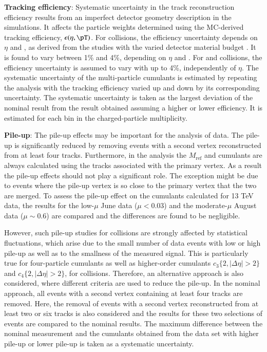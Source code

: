 \documentclass[cernpreprint,texlive=2014,txfonts,UKenglish]{latex/atlasdoc}
\begin{document}
\noindent
\textbf{Tracking efficiency}: Systematic uncertainty in the track reconstruction efficiency results from an imperfect detector geometry description in the simulations. It affects the particle weights determined using the MC-derived tracking efficiency, $\epsilon(\eta,\pT)$.  For \pp collisions, the efficiency uncertainty depends on $\eta$ and \pT, as derived from the studies with the varied detector material budget \cite{STDM-2015-02}. It is found to vary between 1\% and 4\%, depending on $\eta$ and \pT. For \pPb and \PbPb collisions, the efficiency uncertainty is assumed to vary with \pT up to 4\%, independently of $\eta$. The systematic uncertainty of the multi-particle cumulants is estimated by repeating the analysis with the tracking efficiency varied up and down by its corresponding uncertainty. The systematic uncertainty is taken as the largest deviation of the nominal result from the result obtained assuming a higher or lower efficiency. It is estimated for each bin in the charged-particle multiplicity. 

\noindent
\textbf{Pile-up}: The pile-up effects may be important for the analysis of \pp data. The pile-up is significantly reduced by removing events with a second vertex reconstructed from at least four tracks.  Furthermore, in the analysis the $M_{\mathrm{ref}}$ and cumulants are always calculated using the tracks associated with the primary vertex. As a result the pile-up effects should not play a significant role. The exception might be due to events where the pile-up vertex is so close to the primary vertex that the two are merged.  To assess the pile-up effect on the cumulants calculated for 13 TeV \pp data, the results for the low-$\mu$ June data ($\mu < 0.03$) and the moderate-$\mu$ August data ($\mu \sim 0.6$) are compared and the differences are found to be negligible. 

However, such pile-up studies for \pp collisions are strongly affected by statistical fluctuations, which arise due to the small number of data events with low or high pile-up as well as to the smallness of the measured signal. This is particularly true for four-particle cumulants as well as higher-order cumulants  $c_3\{2, |\Delta\eta|>2\}$ and  $c_4\{2, |\Delta\eta|>2\}$, for \pp collisions. Therefore, an alternative approach is also considered, where different criteria are used to reduce the pile-up. In the nominal approach, all events with a second vertex containing at least four tracks are removed. Here, the removal of events with a second vertex reconstructed from at least two or six tracks is also considered and the results for these two selections of events are compared to the nominal results. The maximum difference between the nominal measurement and the cumulants obtained from the data set with higher pile-up or lower pile-up is taken as a systematic uncertainty.
\end{document}
